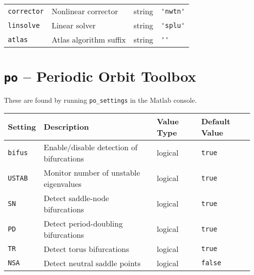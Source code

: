 \documentclass[11pt]{article}
\begin{document}
\begin{table}[h]
\begin{tabular}{l|l|l|l}
    \verb!corrector! & Nonlinear corrector                                                                                                  & string              & \verb!'nwtn'!          \\[1ex]
    \verb!linsolve!  & Linear solver                                                                                                        & string              & \verb!'splu'!          \\[1ex]
    \verb!atlas!     & Atlas algorithm suffix                                                                                               & string              & \verb!''!
  \end{tabular}
\end{table}

\clearpage
\section*{\texttt{po} -- Periodic Orbit Toolbox}

These are found by running \verb!po_settings! in the Matlab console.

\begin{table}[h]
  \centering
  \begin{tabular}{l|l|l|l}
    \textbf{Setting} & \textbf{Description}                     & \textbf{Value Type} & \textbf{Default Value} \\[1ex] \hline
    \verb!bifus!     & Enable/disable detection of bifurcations & logical             & \verb!true!            \\[1ex]
    \verb!USTAB!     & Monitor number of unstable  eigenvalues  & logical             & \verb!true!            \\[1ex]
    \verb!SN!        & Detect saddle-node bifurcations          & logical             & \verb!true!            \\[1ex]
    \verb!PD!        & Detect period-doubling bifurcations      & logical             & \verb!true!            \\[1ex]
    \verb!TR!        & Detect torus bifurcations                & logical             & \verb!true!            \\[1ex]
    \verb!NSA!       & Detect neutral saddle points             & logical             & \verb!false!
  \end{tabular}
\end{table}

\end{document}
